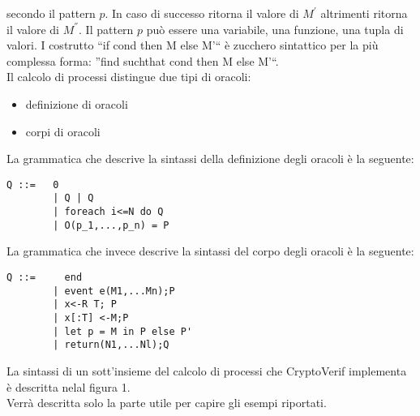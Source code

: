 \documentclass[a4paper,openright,twoside,12pt]{report}
\begin{document}
secondo il pattern $p$. In caso di successo ritorna il valore di $M^{'}$ altrimenti ritorna il valore di $M^{''}$. 
Il pattern $p$ pu\`o essere una variabile, una funzione, una tupla di valori.
I costrutto ``if cond then M else M'`` \`e zucchero sintattico per la pi\`u complessa forma: ''find suchthat cond then M else M'``.\\
Il calcolo di processi distingue due tipi di oracoli:
\begin{itemize}
 \item definizione di oracoli
 \item corpi di oracoli
\end{itemize}
La grammatica che descrive la sintassi della definizione degli oracoli \`e la seguente:
\begin{verbatim}
Q ::=   0
        | Q | Q
        | foreach i<=N do Q
        | O(p_1,...,p_n) = P
\end{verbatim}
La grammatica che invece descrive la sintassi del corpo degli oracoli \`e la seguente:
\begin{verbatim}
Q ::=     end
        | event e(M1,...Mn);P
        | x<-R T; P
        | x[:T] <-M;P
        | let p = M in P else P'
        | return(N1,...Nl);Q
\end{verbatim}






























La sintassi di un sott'insieme del calcolo di processi che CryptoVerif implementa \`e descritta nelal figura 1.\\
Verr\`a descritta solo la parte utile per capire gli esempi riportati.
\end{document}
